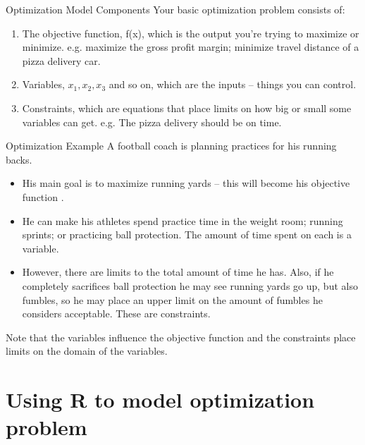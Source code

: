 \documentclass[xcolor=dvipsnames]{beamer}
\begin{document}
\begin{frame}{Optimization Model Components}
Your basic optimization problem consists of: 
\begin{enumerate}
    \item The objective function, {\color{red} f(x)}, which is the output you’re trying to maximize or minimize. e.g. maximize the gross profit margin; minimize travel distance of a pizza delivery car. 
    
    \item  Variables,  {\color{red}$x_1, x_2, x_3$} and so on, which are the inputs – things you can control. 
    
    \item Constraints, which are equations that place limits on how big or small some variables can get. e.g. The pizza delivery should be on time.
    
    
\end{enumerate}


\end{frame}


\begin{frame}{Optimization Example}
    A football coach is planning practices for his running backs.
\begin{itemize}
    \item His main goal is to maximize running yards – this will become his
    {\color{red} objective function} .
    
    \item He can make his athletes spend practice time in the weight room; running 
    sprints; or practicing ball protection. The amount of time spent on each is a 
    {\color{red} variable}.
    
    \item  However, there are limits to the total amount of time he has. Also, if he
    completely sacrifices ball protection he may see running yards go up, but also 
    fumbles, so he may place an upper limit on the amount of fumbles he considers 
    acceptable. These are {\color{red} constraints}.
\end{itemize}

Note that the variables influence the objective function and the constraints place limits on the domain of the variables.
\end{frame}



\section{Using R to model optimization problem}
\end{document}
